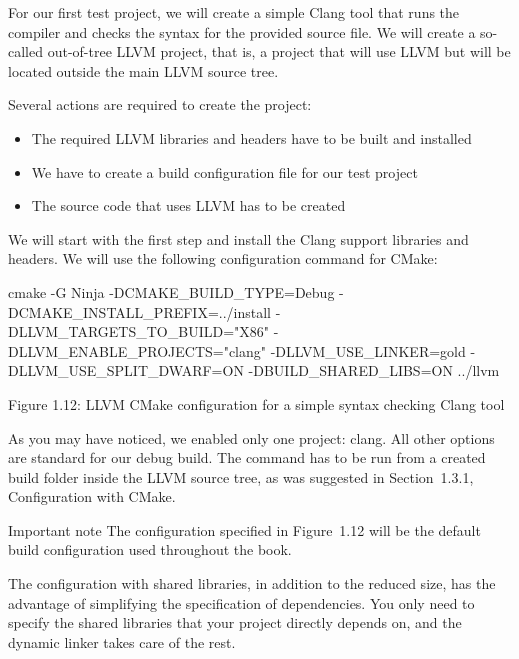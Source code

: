 For our first test project, we will create a simple Clang tool that runs the compiler and checks the syntax for the provided source file. We will create a so-called out-of-tree LLVM project, that is, a project that will use LLVM but will be located outside the main LLVM source tree.

Several actions are required to create the project:

\begin{itemize}
\item
The required LLVM libraries and headers have to be built and installed

\item
We have to create a build configuration file for our test project

\item
The source code that uses LLVM has to be created
\end{itemize}

We will start with the first step and install the Clang support libraries and headers. We will use the following configuration command for CMake:

\begin{shell}
cmake -G Ninja -DCMAKE_BUILD_TYPE=Debug -DCMAKE_INSTALL_PREFIX=../install -DLLVM_TARGETS_TO_BUILD="X86" -DLLVM_ENABLE_PROJECTS="clang" -DLLVM_USE_LINKER=gold -DLLVM_USE_SPLIT_DWARF=ON -DBUILD_SHARED_LIBS=ON ../llvm
\end{shell}

\begin{center}
Figure 1.12: LLVM CMake configuration for a simple syntax checking Clang tool
\end{center}

As you may have noticed, we enabled only one project: clang. All other options are standard for our debug build. The command has to be run from a created build folder inside the LLVM source tree, as was suggested in Section 1.3.1, Configuration with CMake.

\begin{myNotic}{Important note}
The configuration specified in Figure 1.12 will be the default build configuration used throughout the book.
\end{myNotic}

The configuration with shared libraries, in addition to the reduced size, has the advantage of simplifying the specification of dependencies. You only need to specify the shared libraries that your project directly depends on, and the dynamic linker takes care of the rest.

